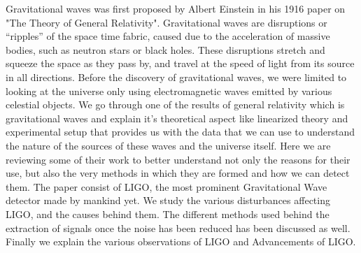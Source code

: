 Gravitational waves was first proposed by Albert Einstein in his 1916 paper on "The Theory of General Relativity". Gravitational waves are disruptions or “ripples” of the space time fabric, caused due to the acceleration of massive bodies, such as neutron stars or black holes. These disruptions stretch and squeeze the space as they pass by, and travel at the speed of light from its source in all directions. Before the discovery of gravitational waves, we were limited to looking at the universe only using electromagnetic waves emitted by various celestial objects. We go through one of the results of general relativity which is gravitational waves and explain it's theoretical aspect like linearized theory and experimental setup that provides us with the data that we can use to understand the nature of the sources of these waves and the universe itself. Here we are reviewing some of their work to better understand not only the reasons for their use, but also the very methods in which they are formed and how we can detect them. The paper consist of LIGO, the most prominent Gravitational Wave detector made by mankind yet. We study the various disturbances affecting LIGO, and the causes behind them. The different methods used behind the extraction of signals once the noise has been reduced has been discussed as well. Finally we explain the various observations of LIGO and Advancements of LIGO. 
